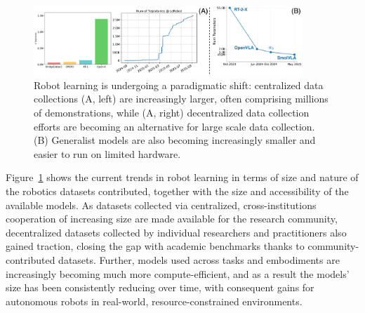 \begin{figure}
    \centering
    \includegraphics[width=0.9\textwidth]{figures/ch5/ch5-trends.png}
    \caption{Robot learning is undergoing a paradigmatic shift: centralized data collections (A, left) are increasingly larger, often comprising millions of demonstrations, while (A, right) decentralized data collection efforts are becoming an alternative for large scale data collection. (B) Generalist models are also becoming increasingly smaller and easier to run on limited hardware.}
    \label{fig:ch5-trends}
\end{figure}

Figure~\ref{fig:ch5-trends} shows the current trends in robot learning in terms of size and nature of the robotics datasets contributed, together with the size and accessibility of the available models.
As datasets collected via centralized, cross-institutions cooperation of increasing size are made available for the research community, decentralized datasets collected by individual researchers and practitioners also gained traction, closing the gap with academic benchmarks thanks to community-contributed datasets.
Further, models used across tasks and embodiments are increasingly becoming much more compute-efficient, and as a result the models' size has been consistently reducing over time, with consequent gains for autonomous robots in real-world, resource-constrained environments.

